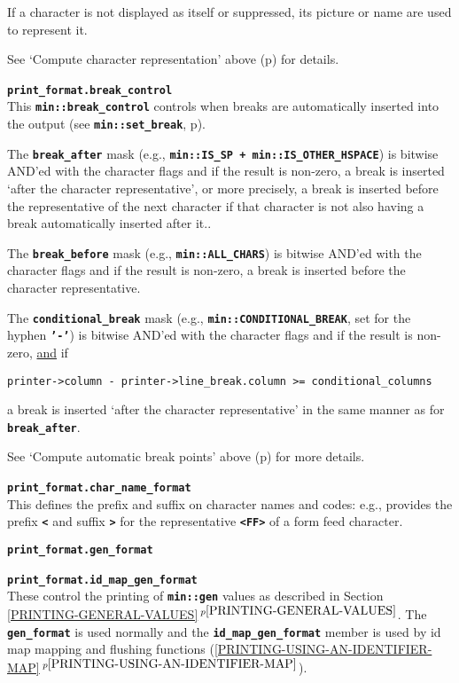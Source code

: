 \documentclass[12pt]{article}
\makeatletter
\newcommand{\TT}[1]{{\tt \bfseries #1}}
\newcommand{\ttmkey}[2]{\TT{#1}\index{#1@{\tt #1}!#2}}
\newcommand{\itemref}[1]{\ref{#1}$\,^{p\pageref{#1}}$}
\newcommand{\pagref}[1]{p\pageref{#1}}
\newcommand{\EOL}{\penalty \exhyphenpenalty}
\newenvironment{itemlist}[1][1.2in]%
	{\begin{list}{}{\setlength{\labelwidth}{#1}%
		        \setlength{\leftmargin}{\labelwidth}%
		        \addtolength{\leftmargin}{+0.2in}%
		        \renewcommand{\makelabel}[1]{##1\hfill}}}%
	{\end{list}}
\makeatother
\begin{document}
\begin{itemlist}[0.6in]
If a character is not displayed as itself or suppressed, its picture
or name are used to represent it.

See `Compute character representation' above
(\pagref{COMPUTE-PRINTED-REPRESENTATION}) for details.

\item[\ttmkey{print\_format.break\_control}{in {\tt min::printer}}]%
\label{PRINT_FORMAT_BREAK_CONTROL}~\\
This \TT{min::break\_control} controls when breaks are automatically
inserted into the output (see \TT{min::\EOL set\_\EOL break},
\pagref{MIN::SET_BREAK}).

The \TT{break\_\EOL after} mask\label{BREAK-AFTER}
(e.g., \TT{min::\EOL IS\_\EOL SP + min::\EOL IS\_\EOL OTHER\_\EOL HSPACE})
is bitwise AND'ed with
the character flags and if the result is non-zero,
a break is inserted `after the character representative', or
more precisely, a break is inserted before the representative
of the next character if that character is not also having
a break automatically inserted after it..

The \TT{break\_\EOL before} mask
(e.g., \TT{min::ALL\_CHARS})
is bitwise AND'ed with
the character flags and if the result is non-zero,
a break is inserted before the character representative.

The \TT{conditional\_\EOL break} mask\label{CONDITIONAL-BREAK}
(e.g., \TT{min::\EOL CONDITIONAL\_\EOL BREAK}, set for the hyphen \TT{'-'})
is bitwise AND'ed with
the character flags and if the result is non-zero,
\underline{and} if
\begin{center}
\tt printer->column - printer->line\_break.column >= conditional\_columns
\end{center}
a break is inserted `after the character representative' in the
same manner as for \TT{break\_\EOL after}.

See `Compute automatic break points' above
(\pagref{COMPUTE-AUTOMATIC-BREAK-POINTS}) for more details.

\item[\ttmkey{print\_format.char\_name\_format}{in {\tt min::printer}}]%
\label{PRINT_FORMAT_CHAR_NAME_FORMAT}~\\
This defines the prefix and suffix on character names and
codes: e.g., provides the prefix \TT{<} and suffix \TT{>} for
the representative \TT{<FF>} of a form feed character.

\item[\ttmkey{print\_format.gen\_format}{in {\tt min::printer}}]
\item[\ttmkey{print\_format.id\_map\_gen\_format}{in {\tt min::printer}}]%
\vspace{-1.5ex}~\\
These control the printing of
\TT{min::gen} values as described in Section \itemref{PRINTING-GENERAL-VALUES}.
The \TT{gen\_\EOL format} is used normally and the
\TT{id\_\EOL map\_\EOL gen\_\EOL format} member is used by id map mapping
and flushing functions (\itemref{PRINTING-USING-AN-IDENTIFIER-MAP}).


\end{itemlist}
\end{document}
